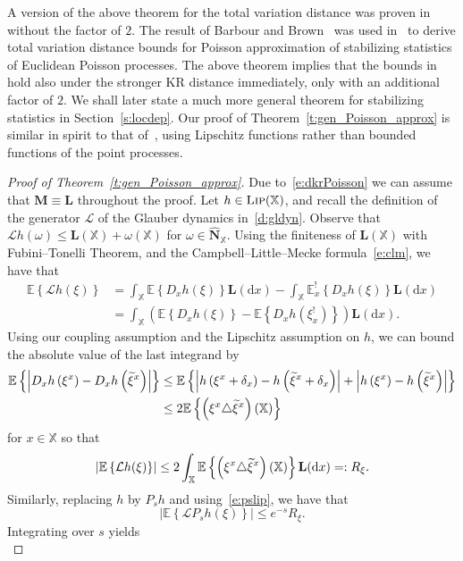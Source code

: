 \documentclass[AHL,Unicode,longabstracts]{cedram}
\newcommand*\bL{\mathbf{L}}
\newcommand*\bM{\mathbf{M}}
\newcommand*\bN{\mathbf{N}}
\newcommand*\X{\mathbb{X}}
\newcommand{\E}{\mathbb{E}}
\newcommand*\cL{\mathcal{L}}
\newcommand*\txi{\tilde{\xi}}
\newcommand*\cLip{\textsc{Lip}}
\newcommand*\md{\mathrm{d}}
\newcommand{\mean}[1] {\E\left\{{#1}\right\}}
\let\oldtilde\tilde
\renewcommand*{\tilde}[1]{\mathchoice{\widetilde{#1}}{\widetilde{#1}}{\oldtilde{#1}}{\oldtilde{#1}}}
\begin{document}
A version of the above theorem for the total variation distance was proven in~\cite[Theorem~2.6]{Barbour1992} without the factor of $2$. The result of Barbour and Brown~\cite{Barbour1992} was used in~\cite[Theorem~3.3]{Otto2020} to derive total variation distance bounds for Poisson approximation of stabilizing statistics of Euclidean Poisson processes. The above theorem implies that the bounds in~\cite[Theorem~3.3]{Otto2020} hold also under the stronger KR distance immediately, only with an additional factor of $2$. We shall later state a much more general theorem for stabilizing statistics in Section~\ref{s:locdep}. Our proof of Theorem~\ref{t:gen_Poisson_approx} is similar in spirit to that of~\cite[Theorem~2.6]{Barbour1992}, using Lipschitz functions rather than bounded functions of the point processes.


\begin{proof}[Proof of Theorem~\ref{t:gen_Poisson_approx}]
Due to~\eqref{e:dkrPoisson} we can assume that $\bM \equiv \bL$ throughout the proof. Let $h\in \cLip(\X)$, and recall the definition of the generator $\cL$ of the Glauber dynamics in~\eqref{d:gldyn}. Observe that $\cL h(\omega) \leq \bL(\X) + \omega(\X)$ for $\omega \in \widehat{\bN}_{\X}$. Using the finiteness of $\bL(\X)$ with Fubini--Tonelli Theorem, and the Campbell--Little--Mecke formula~\eqref{e:clm}, we have that
\begin{align*}
\mean{\cL h(\xi)} & = \int_{\X} \mean{D_xh(\xi)} \bL(\md x) - \int_{\X} \E^{!}_x\left\{D_xh(\xi)\right\}\bL(\md x) \\ & = \int_{\X} \left(\mean{D_xh(\xi)} - \mean{D_xh\left(\xi^{!}_x\right)} \right) \bL(\md x).
\end{align*}
Using our coupling assumption and the Lipschitz assumption on $h$, we can bound the absolute value of the last integrand by
\begin{align*}
\mean{\left|D_xh\left(\xi^x\right) - D_xh\left(\txi^x\right)\right|} &\leq \mean{\left|h\left(\xi^x + \delta_x\right) - h\left(\txi^x +\delta_x\right)\right| + \left|h\left(\xi^x\right) - h\left(\txi^x\right)\right|}\\
&\leq 2 \mean{\left(\xi^x \triangle \txi^x\right)(\X)}
\end{align*}
for $x\in\X$ so that
\[
\left|\mean{\cL h(\xi)}\right| \leq 2 \int_{\X} \mean{\left(\xi^x \triangle \txi^x\right)(\X)} \bL(\md x) =:R_{\xi}.
\]
Similarly, replacing $h$ by $P_sh$ and using~\eqref{e:pslip}, we have that
\[
\left|\mean{\cL P_sh(\xi)}\right| \leq e^{-s} R_{\xi}.
\]
Integrating over $s$ yields
\begin{equation}\label{e:Lpsh_bd}

\end{equation}
\end{proof}
\end{document}
